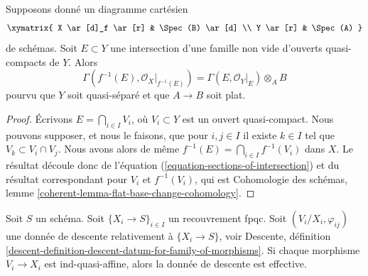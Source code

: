 \begin{lemma}
\label{lemma-affine-base-change}
Supposons donné un diagramme cartésien
$$
\xymatrix{
X \ar[d]_f \ar[r] & \Spec(B) \ar[d] \\
Y \ar[r] & \Spec(A)
}
$$
de schémas. Soit $E \subset Y$ une intersection d'une famille non vide
d'ouverts quasi-compacts de $Y$. Alors
$$
\Gamma(f^{-1}(E), \mathcal{O}_X|_{f^{-1}(E)}) =
\Gamma(E, \mathcal{O}_Y|_E) \otimes_A B
$$
pourvu que $Y$ soit quasi-séparé et que $A \to B$ soit plat.
\end{lemma}

\begin{proof}
Écrivons $E = \bigcap_{i \in I} V_i$, où $V_i \subset Y$ est un ouvert quasi-compact.
Nous pouvons supposer, et nous le faisons, que pour $i, j \in I$ il existe $k \in I$ tel que
$V_k \subset V_i \cap V_j$. Nous avons alors de même
$f^{-1}(E) = \bigcap_{i \in I} f^{-1}(V_i)$ dans $X$.
Le résultat découle donc de l'équation (\ref{equation-sections-of-intersection})
et du résultat correspondant pour $V_i$ et $f^{-1}(V_i)$, qui est
Cohomologie des schémas, lemme \ref{coherent-lemma-flat-base-change-cohomology}.
\end{proof}

\begin{lemma}[Gabber]
\label{lemma-ind-quasi-affine}
Soit $S$ un schéma. Soit $\{X_i \to S\}_{i\in I}$ un recouvrement fpqc.
Soit $(V_i/X_i, \varphi_{ij})$ une donnée de descente relativement à
$\{X_i \to S\}$, voir Descente, définition
\ref{descent-definition-descent-datum-for-family-of-morphisms}. 
Si chaque morphisme $V_i \to X_i$ est ind-quasi-affine, alors la donnée de descente
est effective.
\end{lemma}

